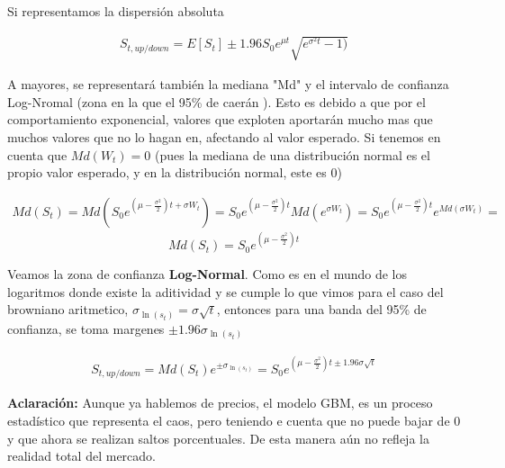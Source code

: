 \documentclass[11pt]{article}
\newcommand{\comillas}[1]{"#1"} %
\begin{document}
	Si representamos la dispersión absoluta
	
	\begin{gather}
		\boxed{S_{t,up/down} = E[S_t] \pm 1.96 S_0 e^{\mu t}\sqrt{e^{\sigma^2t} - 1)}}
	\end{gather}
	
	A mayores, se representará también la mediana \comillas{Md} y el intervalo de confianza Log-Nromal (zona en la que el 95\% de caerán ). Esto es debido a que por el comportamiento exponencial, valores que exploten aportarán mucho mas que muchos valores que no lo hagan en, afectando al valor esperado. Si tenemos en cuenta que $Md(W_t) = 0$ (pues la mediana de una distribución normal es el propio valor esperado, y en la distribución normal, este es 0)
	
	\begin{gather*}
		Md(S_t) = Md\left( S_0 e^{ \left(\mu - \frac{\sigma^2}{2}\right)t + \sigma W_t}\right)  = S_0 e^{ \left(\mu - \frac{\sigma^2}{2}\right)t}Md(e^{\sigma W_t}) = S_0 e^{ \left(\mu - \frac{\sigma^2}{2}\right)t}e^{Md(\sigma W_t)} = 
	\end{gather*}
	\begin{equation}
		\boxed{Md(S_t) = S_0 e^{ \left(\mu - \frac{\sigma^2}{2}\right)t}}
	\end{equation}
	
	Veamos la zona de confianza \textbf{Log-Normal}. Como es en el mundo de los logaritmos donde existe la aditividad y se cumple lo que vimos para el caso del browniano aritmetico, $\sigma_{\ln(s_t)} = \sigma\sqrt{t}$, entonces para una banda del 95\% de confianza, se toma margenes $\pm 1.96\sigma_{\ln(s_t)}$
	
	\begin{gather}
		\boxed{S_{t,up/down} = Md(S_t)e^{\pm \sigma_{\ln(s_t)}} = S_0 e^{ \left(\mu - \frac{\sigma^2}{2}\right)t \pm 1.96\sigma \sqrt{t}}}
	\end{gather}
	
	\textbf{Aclaración:} Aunque ya hablemos de precios, el modelo GBM, es un proceso estadístico que representa el caos, pero teniendo e cuenta que no puede bajar de 0 y que ahora se realizan saltos porcentuales. De esta manera aún no refleja la realidad total del mercado.
	
	
	\renewcommand{\refname}{Bibliografía}
	
\end{document}
